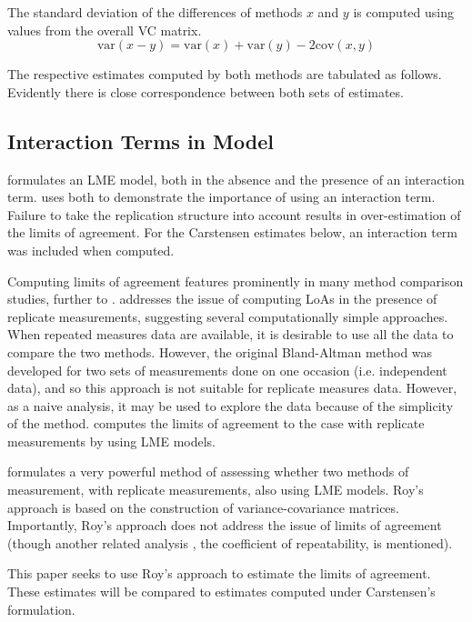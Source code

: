\documentclass[12pt, a4paper]{article}
\theoremstyle{plain}
\theoremstyle{definition}
\theoremstyle{remark}
\begin{document}
The standard deviation of the differences of methods $x$ and $y$ is computed using values from the overall VC matrix.
\[
\mbox{var}(x - y ) = \mbox{var} ( x )  + \mbox{var} ( y ) - 2\mbox{cov} ( x ,y )
\]


The respective estimates computed by both methods are tabulated as follows. Evidently there is close correspondence between both sets of estimates.




\subsection{Interaction Terms in Model}
\citet{BXC2008} formulates an LME model, both in the absence and the presence of an interaction term.\citet{bxc} uses both to demonstrate the importance of using an interaction term. Failure to take the replication structure into
account results in over-estimation of the limits of agreement. For the Carstensen estimates below, an interaction term was included when computed.
\newpage

Computing limits of agreement features prominently in many method comparison studies, further to \citet{BA86,BA99}.
\citet{BA99} addresses the issue of computing LoAs in the presence of replicate measurements, suggesting several computationally simple approaches. When repeated measures data are available, it is desirable to use
all the data to compare the two methods. However, the original Bland-Altman method was developed for two sets of measurements done on one occasion (i.e. independent data), and so this approach is not suitable for replicate measures data. However, as a naive analysis, it may be used to explore the data because of the simplicity of the method.
\citet{bxc2008}  computes the limits of agreement to the case with replicate measurements by using LME models.

\citet{Roy} formulates a very powerful method of assessing whether two methods of measurement, with replicate measurements, also using LME models. Roy's approach is based on the construction of variance-covariance matrices.
Importantly, Roy's approach does not address the issue of limits of agreement (though another related analysis , the coefficient of repeatability, is mentioned).

This paper seeks to use Roy's approach to estimate the limits of agreement. These estimates will be compared to estimates computed under Carstensen's formulation.
\end{document}
